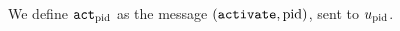 \begin{definition}
  We define $\mathtt{act}_{\mathrm{pid}}$ as the message $\left(\mathtt{activate},
  \mathrm{pid}\right)$, sent to $u_{\mathrm{pid}}$.
\end{definition}

